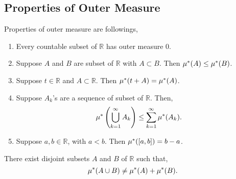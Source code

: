 \subsection{Properties of Outer Measure}
Properties of outer measure are followings,
\begin{enumerate}
    \item Every countable subset of $\mathds{R}$ has outer measure $0$.
    \item Suppose  $A$ and  $B$ are subset of  $\mathds{R}$ with $A\subset B$. Then  $\mu^{*}(A)\le \mu^{*}(B)$.
    \item Suppose $t\in\mathds{R}$ and $A\subset \mathds{R}$. Then $\mu^{*}(t+A)=\mu^{*}(A)$.
    \item Suppose  $A_k$'s are a sequence of subset of  $\mathds{R}$. Then,
        \[
            \mu^{*}\left( \bigcup_{k=1}^{\infty}A_k \right)\le \sum_{k=1}^{\infty}\mu^{*}(A_k). 
        \]
    \item Suppose $a,b\in\mathds{R}$, with $a<b$. Then  $\mu^{*}([a,b])=b-a$.
\end{enumerate}
\begin{theorem}
    \label{nonadditivity OM}
    There exist disjoint subsets $A$ and  $B$ of  $\mathds{R}$ such that,
    \[
        \mu^{*}(A\cup B)\neq \mu^{*}(A)+\mu^{*}(B).
    \]
\end{theorem}
